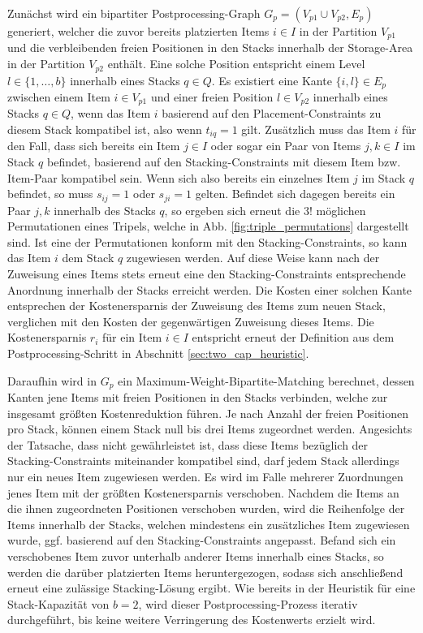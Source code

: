 Zunächst wird ein bipartiter Postprocessing-Graph $G_p = (V_{p1} \cup V_{p2}, E_p)$ generiert,
welcher die zuvor bereits platzierten Items $i \in I$ in der Partition $V_{p1}$ und die verbleibenden
freien Positionen in den Stacks innerhalb der Storage-Area in der Partition $V_{p2}$ enthält.
Eine solche Position entspricht einem Level $l \in \{1, \dotsc, b\}$ innerhalb eines Stacks $q \in Q$.
Es existiert eine Kante $\{i, l\} \in E_p$ zwischen einem Item $i \in V_{p1}$ und einer freien
Position $l \in V_{p2}$ innerhalb eines Stacks $q \in Q$, wenn das Item $i$ basierend auf den Placement-Constraints
zu diesem Stack kompatibel ist, also wenn $t_{iq} = 1$ gilt.
Zusätzlich muss das Item $i$ für den Fall, dass sich bereits ein Item $j \in I$ oder sogar ein Paar von Items $j, k \in I$
im Stack $q$ befindet, basierend auf den Stacking-Constraints mit diesem Item bzw. Item-Paar kompatibel sein.
Wenn sich also bereits ein einzelnes Item $j$ im Stack $q$ befindet, so muss $s_{ij} = 1$ oder $s_{ji} = 1$ gelten.
Befindet sich dagegen bereits ein Paar $j, k$ innerhalb des Stacks $q$, so ergeben sich erneut die $3!$ möglichen Permutationen
eines Tripels, welche in Abb. \ref{fig:triple_permutations} dargestellt sind. Ist eine der Permutationen konform mit den Stacking-Constraints, so kann das Item $i$ dem Stack $q$ zugewiesen werden. Auf diese Weise kann nach der Zuweisung eines Items stets erneut eine den Stacking-Constraints entsprechende Anordnung innerhalb der Stacks erreicht werden.
Die Kosten einer solchen Kante entsprechen der Kostenersparnis der Zuweisung des Items zum neuen Stack, verglichen mit den Kosten der gegenwärtigen Zuweisung dieses Items. Die Kostenersparnis $r_i$ für ein Item $i \in I$ entspricht erneut der Definition aus dem Postprocessing-Schritt in Abschnitt \ref{sec:two_cap_heuristic}.

Daraufhin wird in $G_p$ ein Maximum-Weight-Bipartite-Matching berechnet, dessen Kanten jene Items
mit freien Positionen in den Stacks verbinden, welche zur insgesamt größten Kostenreduktion führen.
Je nach Anzahl der freien Positionen pro Stack, können einem Stack null bis drei Items zugeordnet werden.
Angesichts der Tatsache, dass nicht gewährleistet ist, dass diese Items bezüglich der Stacking-Constraints miteinander kompatibel sind, darf jedem Stack allerdings nur ein neues Item zugewiesen werden.
Es wird im Falle mehrerer Zuordnungen jenes Item mit der größten Kostenersparnis verschoben.
Nachdem die Items an die ihnen zugeordneten Positionen verschoben wurden, wird die Reihenfolge der Items
innerhalb der Stacks, welchen mindestens ein zusätzliches Item zugewiesen wurde, ggf. basierend auf den Stacking-Constraints angepasst. Befand sich ein verschobenes Item zuvor unterhalb anderer Items innerhalb eines Stacks, so werden die darüber platzierten Items heruntergezogen, sodass sich anschließend erneut eine zulässige Stacking-Lösung ergibt.
Wie bereits in der Heuristik für eine Stack-Kapazität von $b = 2$, wird dieser Postprocessing-Prozess
iterativ durchgeführt, bis keine weitere Verringerung des Kostenwerts erzielt wird.\newline

